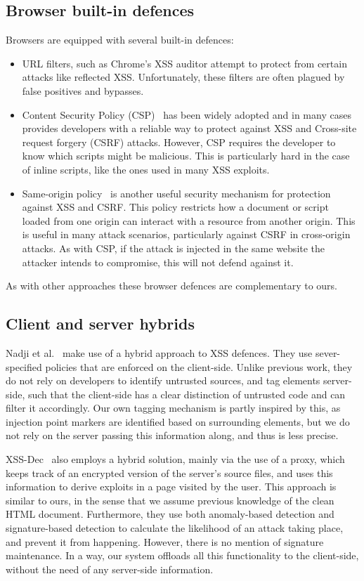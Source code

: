 \subsection{Browser built-in defences}
Browsers are equipped with several built-in defences:
\begin{itemize}
	\item  URL filters, such as Chrome's \ac{XSS} auditor attempt to protect from certain attacks like reflected \ac{XSS}. Unfortunately, these filters are often plagued by false positives and bypasses.
	\item Content Security Policy (CSP)~\cite{CSP} has been widely adopted and in many cases provides developers with a reliable way to protect against \ac{XSS} and Cross-site request forgery (CSRF) attacks. However, CSP requires the developer to know which scripts might be malicious. This is particularly hard in the case of inline scripts, like the ones used in many \ac{XSS} exploits.
	\item Same-origin policy~\cite{SOP} is another useful security mechanism for protection against \ac{XSS} and CSRF. This policy restricts how a document or script loaded from one origin can interact with a resource from another origin. This is useful in many attack scenarios, particularly against CSRF in cross-origin attacks. As with CSP, if the attack is injected in the same website the attacker intends to compromise, this will not defend against it.
\end{itemize}

As with other approaches these browser defences are complementary to ours.

\subsection{Client and server hybrids}
Nadji et al.~\cite{Nadji:2009} make use of a hybrid approach to \ac{XSS} defences. They use sever-specified policies that are enforced on the client-side. Unlike previous work, they do not rely on developers to identify untrusted sources, and tag elements server-side, such that the client-side has a clear distinction of untrusted code and can filter it accordingly. Our own tagging mechanism is partly inspired by this, as injection point markers are identified based on surrounding elements, but we do not rely on the server passing this information along, and thus is less precise.

XSS-Dec~\cite{10.1007/978-3-642-31540-4_17} also employs a hybrid solution, mainly via the use of a proxy, which keeps track of an encrypted version of the server's source files, and uses this information to derive exploits in a page visited by the user. This approach is similar to ours, in the sense that we assume previous knowledge of the clean HTML document. Furthermore, they use both anomaly-based detection and signature-based detection to calculate the likelihood of an attack taking place, and prevent it from happening. However, there is no mention of signature maintenance. In a way, our system offloads all this functionality to the client-side, without the need of any server-side information.

